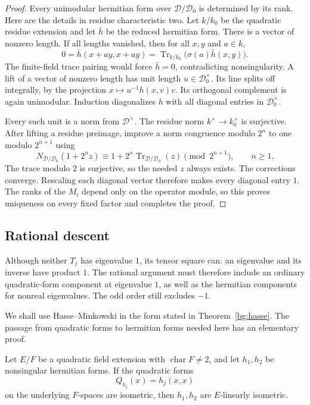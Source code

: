 \begin{proof}
Every unimodular hermitian form over
$\mathcal D/\mathcal D_0$ is determined by its rank.  Here are the
details in residue characteristic two.  Let $k/k_0$ be the quadratic
residue extension and let $\bar h$ be the reduced hermitian form.
There is a vector of nonzero length.  If all lengths vanished, then
for all $x,y$ and $a\in k$,
\[
 0=\bar h(x+ay,x+ay)
   =\operatorname{Tr}_{k/k_0}
       \bigl(\sigma(a)\bar h(x,y)\bigr).
\]
The finite-field trace pairing would force $\bar h=0$, contradicting
nonsingularity.  A lift of a vector of nonzero length has unit length
$u\in\mathcal D_0^\times$.  Its line splits off integrally, by the
projection $x\mapsto u^{-1}h(x,v)v$.  Its orthogonal complement is
again unimodular.  Induction diagonalizes $h$ with all diagonal
entries in $\mathcal D_0^\times$.

Every such unit is a norm from $\mathcal D^\times$.  The residue norm
$k^\times\to k_0^\times$ is surjective.  After lifting a residue
preimage, improve a norm congruence modulo $2^n$ to one modulo
$2^{n+1}$ using
\[
 N_{\mathcal D/\mathcal D_0}(1+2^nz)
  \equiv1+2^n\operatorname{Tr}_{\mathcal D/\mathcal D_0}(z)
       \pmod{2^{n+1}},\qquad n\geq1.
\]
The trace modulo $2$ is surjective, so the needed $z$ always exists.
The corrections converge.  Rescaling each diagonal vector therefore
makes every diagonal entry $1$.  The ranks of the $M_i$ depend only
on the operator module, so this proves uniqueness on every fixed
factor and completes the proof.
\end{proof}

\subsection{Rational descent}

Although neither $T_j$ has eigenvalue $1$, its tensor square can:
an eigenvalue and its inverse have product $1$.  The rational argument
must therefore include an ordinary quadratic-form component at
eigenvalue $1$, as well as the hermitian components for nonreal
eigenvalues.  The odd order still excludes $-1$.

We shall use Hasse--Minkowski in the form stated in
Theorem~\ref{bg:hasse}.  The passage from quadratic forms to hermitian
forms needed here has an elementary proof.

\begin{lemma}
\label{local:hermitian-lengths}
Let $E/F$ be a quadratic field extension with $\operatorname{char}F\ne2$,
and let $h_1,h_2$ be nonsingular hermitian forms.  If the quadratic
forms
\[
 Q_{h_j}(x)=h_j(x,x)
\]
on the underlying $F$-spaces are isometric, then $h_1,h_2$ are
$E$-linearly isometric.
\end{lemma}

